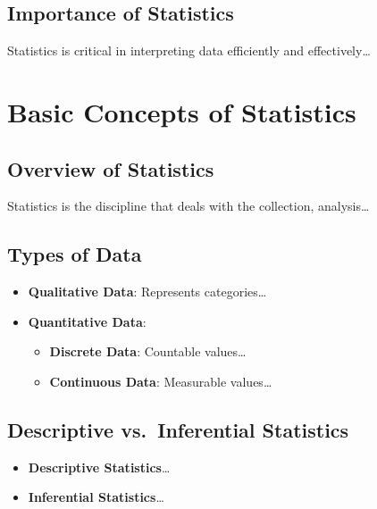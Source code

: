 \documentclass[
  letterpaper,
  DIV=11,
  numbers=noendperiod]{scrreprt}
\providecommand{\tightlist}{%
  \setlength{\itemsep}{0pt}\setlength{\parskip}{0pt}}
\begin{document}
\section{Importance of Statistics}\label{importance-of-statistics}

Statistics is critical in interpreting data efficiently and
effectively\ldots{}


\chapter{Basic Concepts of
Statistics}\label{basic-concepts-of-statistics}

\section{Overview of Statistics}\label{overview-of-statistics}

Statistics is the discipline that deals with the collection,
analysis\ldots{}

\section{Types of Data}\label{types-of-data}

\begin{itemize}
\tightlist
\item
  \textbf{Qualitative Data}: Represents categories\ldots{}
\item
  \textbf{Quantitative Data}:

  \begin{itemize}
  \tightlist
  \item
    \textbf{Discrete Data}: Countable values\ldots{}
  \item
    \textbf{Continuous Data}: Measurable values\ldots{}
  \end{itemize}
\end{itemize}

\section{Descriptive vs.~Inferential
Statistics}\label{descriptive-vs.-inferential-statistics}

\begin{itemize}
\tightlist
\item
  \textbf{Descriptive Statistics}\ldots{}
\item
  \textbf{Inferential Statistics}\ldots{}
\end{itemize}
\end{document}

